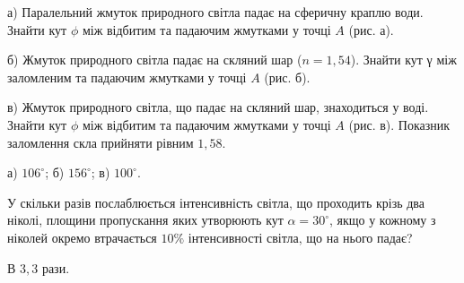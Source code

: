 \begin{problem}%
    а) Паралельний жмуток природного світла падає на сферичну краплю води. Знайти кут $ \phi $ між відбитим та падаючим жмутками у точці $ A $ (рис. а).

    б) Жмуток природного світла падає на скляний шар ($ n = 1,54 $). Знайти кут γ між заломленим та падаючим жмутками у точці $ A $ (рис. б).

    в) Жмуток природного світла, що падає на скляний шар, знаходиться у
        воді. Знайти кут $ \phi $ між відбитим та падаючим жмутками у точці $ A $ (рис. в). Показник заломлення скла прийняти рівним $ 1,58 $.
    \begin{solution}
       а) $ 106^\circ $; б) $ 156^\circ $; в) $ 100^\circ $.
    \end{solution}

    
\end{problem}





\begin{problem}%
    У скільки разів послаблюється інтенсивність світла, що проходить крізь два ніколі, площини пропускання яких утворюють кут  $ \alpha = 30^\circ $, якщо у кожному з ніколей окремо втрачається $ 10\% $ інтенсивності світла, що на нього падає?
    \begin{solution}
        В $ 3,3 $ рази.
    \end{solution}
\end{problem}


